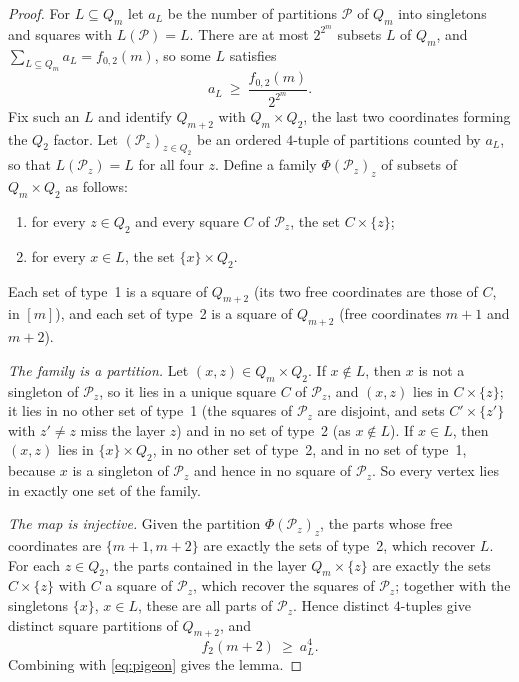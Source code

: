 \documentclass[11pt,a4paper]{article}
\theoremstyle{plain}
\theoremstyle{definition}
\theoremstyle{remark}
\newcommand{\cP}{\mathcal P}
\begin{document}
\label{pf:lift}
\lemlift*
\begin{proof}
For $L\subseteq Q_m$ let $a_L$ be the number of partitions $\cP$ of $Q_m$ into singletons and squares with $L(\cP)=L$. There are at most $2^{2^m}$ subsets $L$ of $Q_m$, and $\sum_{L\subseteq Q_m}a_L=f_{0,2}(m)$, so some $L$ satisfies
\begin{equation}\label{eq:pigeon}
 a_L\ \ge\ \frac{f_{0,2}(m)}{2^{2^m}} .
\end{equation}
Fix such an $L$ and identify $Q_{m+2}$ with $Q_m\times Q_2$, the last two coordinates forming the $Q_2$ factor. Let $(\cP_z)_{z\in Q_2}$ be an ordered $4$-tuple of partitions counted by $a_L$, so that $L(\cP_z)=L$ for all four $z$. Define a family $\Phi(\cP_z)_{z}$ of subsets of $Q_m\times Q_2$ as follows:
\begin{enumerate}[nosep]
\item for every $z\in Q_2$ and every square $C$ of $\cP_z$, the set $C\times\{z\}$;
\item for every $x\in L$, the set $\{x\}\times Q_2$.
\end{enumerate}
Each set of type~1 is a square of $Q_{m+2}$ (its two free coordinates are those of $C$, in $[m]$), and each set of type~2 is a square of $Q_{m+2}$ (free coordinates $m+1$ and $m+2$).

\emph{The family is a partition.} Let $(x,z)\in Q_m\times Q_2$. If $x\notin L$, then $x$ is not a singleton of $\cP_z$, so it lies in a unique square $C$ of $\cP_z$, and $(x,z)$ lies in $C\times\{z\}$; it lies in no other set of type~1 (the squares of $\cP_z$ are disjoint, and sets $C'\times\{z'\}$ with $z'\ne z$ miss the layer $z$) and in no set of type~2 (as $x\notin L$). If $x\in L$, then $(x,z)$ lies in $\{x\}\times Q_2$, in no other set of type~2, and in no set of type~1, because $x$ is a singleton of $\cP_z$ and hence in no square of $\cP_z$. So every vertex lies in exactly one set of the family.

\emph{The map is injective.} Given the partition $\Phi(\cP_z)_z$, the parts whose free coordinates are $\{m+1,m+2\}$ are exactly the sets of type~2, which recover $L$. For each $z\in Q_2$, the parts contained in the layer $Q_m\times\{z\}$ are exactly the sets $C\times\{z\}$ with $C$ a square of $\cP_z$, which recover the squares of $\cP_z$; together with the singletons $\{x\}$, $x\in L$, these are all parts of $\cP_z$. Hence distinct $4$-tuples give distinct square partitions of $Q_{m+2}$, and
\[
 f_2(m+2)\ \ge\ a_L^4 .
\]
Combining with \eqref{eq:pigeon} gives the lemma.
\end{proof}
\end{document}
